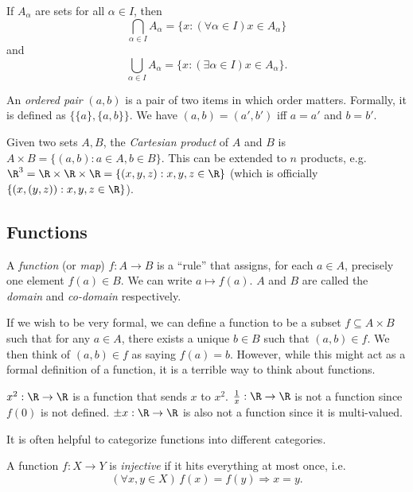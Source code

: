 \documentclass[a4paper]{article}
\begin{document}
\begin{notation}
  If $A_\alpha$ are sets for all $\alpha \in I$, then
  \[
    \bigcap_{\alpha\in I}A_\alpha = \{x: (\forall\alpha\in I) x\in A_\alpha\}
  \]
  and
  \[
    \bigcup_{\alpha\in I}A_\alpha = \{x: (\exists\alpha\in I) x\in A_\alpha\}.
  \]
\end{notation}

\begin{defi}
  An \emph{ordered pair} $(a, b)$ is a pair of two items in which order matters. Formally, it is defined as $\{\{a\}, \{a, b\}\}$. We have $(a, b) = (a', b')$ iff $a = a'$ and $b = b'$.
\end{defi}

\begin{defi}
  Given two sets $A, B$, the \emph{Cartesian product} of $A$ and $B$ is $A\times B = \{(a, b):a\in A, b\in B\}$. This can be extended to $n$ products, e.g.\ $\R^3 = \R\times\R\times\R = \{(x,y,z): x, y, z\in \R\}$ (which is officially $\{(x, (y, z)): x, y, z\in \R\}$).
\end{defi}

\subsection{Functions}
\begin{defi}
  A \emph{function} (or \emph{map}) $f: A\to B$ is a ``rule'' that assigns, for each $a\in A$, precisely one element $f(a)\in B$. We can write $a\mapsto f(a)$. $A$ and $B$ are called the \emph{domain} and \emph{co-domain} respectively.
\end{defi}
If we wish to be very formal, we can define a function to be a subset $f\subseteq A\times B$ such that for any $a\in A$, there exists a unique $b\in B$ such that $(a, b)\in f$. We then think of $(a, b) \in f$ as saying $f(a) = b$. However, while this might act as a formal definition of a function, it is a terrible way to think about functions.

\begin{eg}
  $x^2: \R \to \R$ is a function that sends $x$ to $x^2$. $\frac{1}{x}:\R\to\R$ is not a function since $f(0)$ is not defined. $\pm x: \R\to\R$ is also not a function since it is multi-valued.
\end{eg}

It is often helpful to categorize functions into different categories.
\begin{defi}
  A function $f: X \to Y$ is \emph{injective} if it hits everything at most once, i.e.
  \[
    (\forall x, y\in X)\,f(x) = f(y)\Rightarrow x = y.
  \]
\end{defi}
\end{document}
